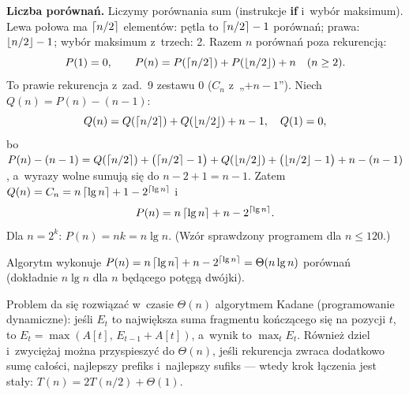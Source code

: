 \documentclass[11pt]{article}
\begin{document}
\textbf{Liczba porównań.} Liczymy porównania sum (instrukcje \textbf{if} i~wybór
maksimum). Lewa połowa ma $\left\lceil n/2 \right\rceil$ elementów: pętla to $\left\lceil n/2 \right\rceil-1$
porównań; prawa: $\left\lfloor n/2 \right\rfloor-1$; wybór maksimum z~trzech: 2. Razem
$n$ porównań poza rekurencją:
\[
P(1)=0,\qquad P(n)=P(\left\lceil n/2 \right\rceil)+P(\left\lfloor n/2 \right\rfloor)+n\quad(n\ge2).
\]
To prawie rekurencja z~zad.~9 zestawu 0 ($C_n$ z~„$+n-1$”). Niech $Q(n)=P(n)-(n-1)$:
\[
Q(n)=Q(\left\lceil n/2 \right\rceil)+Q(\left\lfloor n/2 \right\rfloor)+n-1,\quad Q(1)=0,
\]
bo $P(n)-(n-1)=Q(\left\lceil n/2 \right\rceil)+\bigl(\left\lceil n/2 \right\rceil-1\bigr)+Q(\left\lfloor n/2 \right\rfloor)+\bigl(\left\lfloor n/2 \right\rfloor-1\bigr)+n-(n-1)$,
a~wyrazy wolne sumują się do $n-2+1=n-1$. Zatem $Q(n)=C_n=n\left\lceil \operatorname{lg} n \right\rceil+1-2^{\left\lceil \operatorname{lg} n \right\rceil}$ i
\[
P(n)=n\left\lceil \operatorname{lg} n \right\rceil+n-2^{\left\lceil \operatorname{lg} n \right\rceil}.
\]
Dla $n=2^k$: $P(n)=nk=n\lg n$. (Wzór sprawdzony programem dla $n\le120$.)
\begin{odpowiedz}
Algorytm wykonuje $P(n)=n\left\lceil \operatorname{lg} n \right\rceil+n-2^{\left\lceil \operatorname{lg} n \right\rceil}=\Theta(n\operatorname{lg} n)$ porównań
(dokładnie $n\lg n$ dla $n$ będącego potęgą dwójki).
\end{odpowiedz}

\begin{uwaga}
Problem da się rozwiązać w~czasie $\Theta(n)$ algorytmem Kadane
(programowanie dynamiczne): jeśli $E_t$ to największa suma fragmentu
kończącego się na pozycji $t$, to $E_t=\max(A[t],\,E_{t-1}+A[t])$, a~wynik
to $\max_tE_t$. Również
dziel i~zwyciężaj można przyspieszyć do $\Theta(n)$, jeśli rekurencja
zwraca dodatkowo sumę całości, najlepszy prefiks i~najlepszy sufiks
--- wtedy krok łączenia jest stały: $T(n)=2T(n/2)+\Theta(1)$.
\end{uwaga}
\end{document}
